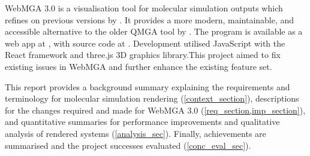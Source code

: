 WebMGA 3.0 is a visualisation tool for molecular simulation outputs which refines on previous versions by \textcite{Battistini_2021,webmga_2}. It provides a more modern, maintainable, and accessible alternative to the older QMGA tool by \textcite{gabriel2008molecular}. The program is available as a web app at , with source code at . Development utilised JavaScript with the React\cite{react} framework and three.js\cite{three} 3D graphics library.This project aimed to fix existing issues in WebMGA and further enhance the existing feature set.

This report provides a background summary explaining the requirements and terminology for molecular simulation rendering (\cref{context_section}), descriptions for the changes required and made for WebMGA 3.0 (\cref{req_section,imp_section}), and quantitative summaries for performance improvements and qualitative analysis of rendered systems (\cref{analysis_sec}). Finally, achievements are summarised and the project successes evaluated (\cref{conc_eval_sec}).
